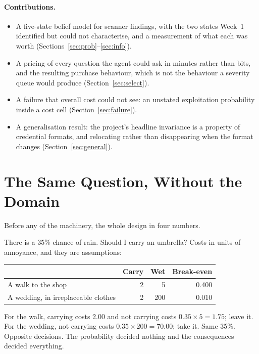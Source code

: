 \documentclass{article}
\begin{document}
\paragraph{Contributions.}
\begin{itemize}
\item A five-state belief model for scanner findings, with the two states Week~1
identified but could not characterise, and a measurement of what each was worth
(Sections~\ref{sec:prob}--\ref{sec:info}).
\item A pricing of every question the agent could ask in minutes rather than
bits, and the resulting purchase behaviour, which is not the behaviour a severity
queue would produce (Section~\ref{sec:select}).
\item A failure that overall cost could not see: an unstated exploitation
probability inside a cost cell (Section~\ref{sec:failure}).
\item A generalisation result: the project's headline invariance is a property of
credential formats, and relocating rather than disappearing when the format
changes (Section~\ref{sec:general}).
\end{itemize}

\section{The Same Question, Without the Domain}
\label{sec:umbrella}

Before any of the machinery, the whole design in four numbers.

There is a 35\% chance of rain. Should I carry an umbrella? Costs in units of
annoyance, and they are assumptions:

\begin{center}
\small
\begin{tabular}{@{}lrrr@{}}
\toprule
& Carry & Wet & Break-even \\
\midrule
A walk to the shop & 2 & 5 & 0.400 \\
A wedding, in irreplaceable clothes & 2 & 200 & 0.010 \\
\bottomrule
\end{tabular}
\end{center}

For the walk, carrying costs 2.00 and not carrying costs $0.35 \times 5 = 1.75$;
leave it. For the wedding, not carrying costs $0.35 \times 200 = 70.00$; take it.
Same 35\%. Opposite decisions. The probability decided nothing and the
consequences decided everything.
\end{document}
